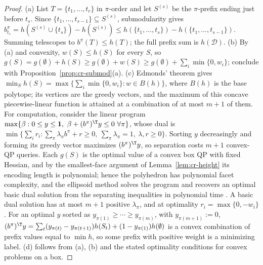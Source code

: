 \begin{proof}
(a) List $T=\{t_1,\ldots,t_r\}$ in $\pi$-order and let $S^{(s)}$ be the
$\pi$-prefix ending just before $t_s$. Since
$\{t_1,\ldots,t_{s-1}\}\subseteq S^{(s)}$, submodularity gives
$b^\pi_{t_s}=h(S^{(s)}\cup\{t_s\})-h(S^{(s)})
\le h(\{t_1,\ldots,t_s\})-h(\{t_1,\ldots,t_{s-1}\})$. Summing telescopes
to $b^\pi(T)\le h(T)$; the full prefix sum is $h(\mathcal D)$.
(b) By (a) and convexity, $w(S)\le h(S)$ for every $S$, so
$g(S)=g(\emptyset)+h(S)\ge g(\emptyset)+w(S)\ge g(\emptyset)+\sum_i\min\{0,w_i\}$;
conclude with Proposition~\ref{prop:cr-submod}(a).
(c) Edmonds' theorem gives
$\min_Sh(S)=\max\{\sum_i\min\{0,w_i\}: w\in B(h)\}$, where $B(h)$ is the
base polytope; its vertices are the greedy vectors, and the maximum of
this concave piecewise-linear function is attained at a combination of at
most $m+1$ of them. For computation, consider the linear program
$\max\{\beta: 0\le y\le\mathbf 1,\ \beta+(b^\pi)^{\T}y\le0\ \forall\pi\}$,
whose dual is $\min\{\sum_ir_i : \sum_\pi\lambda_\pi b^\pi+r\ge0,\
\sum_\pi\lambda_\pi=1,\ \lambda,r\ge0\}$. Sorting $y$ decreasingly and
forming its greedy vector maximizes $(b^\pi)^{\T}y$, so separation
costs $m+1$ convex-QP queries. Each $g(S)$ is the optimal value of a convex
box QP with fixed Hessian, and by the smallest-face argument of
Lemma~\ref{lem:cr-height} its encoding length is polynomial; hence the
polyhedron has polynomial facet complexity, and the ellipsoid method
solves the program and recovers an optimal basic dual solution from the
separating inequalities in polynomial time
\cite[Thm.~6.4.9, Lemma~6.5.15]{GrotschelLovaszSchrijver1988}. A basic dual
solution has at most $m+1$ positive $\lambda_\pi$, and at optimality
$r_i=\max\{0,-w_i\}$. For an optimal $y$ sorted as
$y_{\pi(1)}\ge\cdots\ge y_{\pi(m)}$, with $y_{\pi(m+1)}:=0$,
$(b^\pi)^{\T}y=\sum_t(y_{\pi(t)}-y_{\pi(t+1)})h(S_t)+(1-y_{\pi(1)})h(\emptyset)$
is a convex combination of prefix values equal to $\min h$, so some prefix
with positive weight is a minimizing label. (d) follows from (a), (b) and
the stated optimality conditions for convex problems on a box.
\end{proof}
